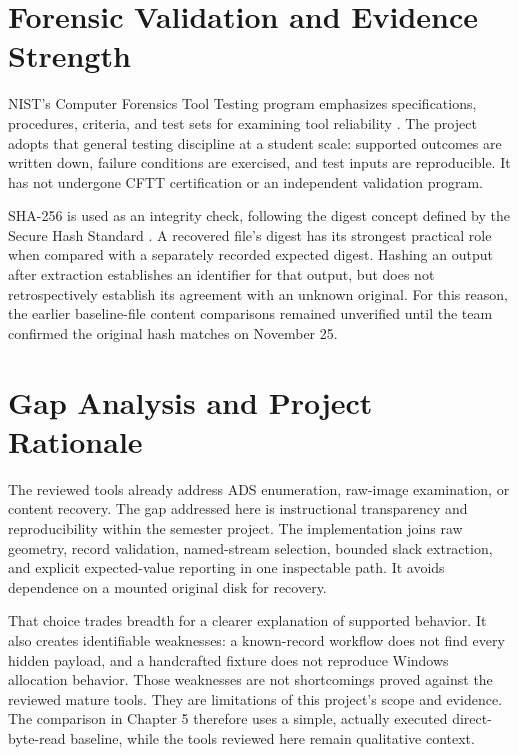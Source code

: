 \section{Forensic Validation and Evidence Strength}
NIST's Computer Forensics Tool Testing program emphasizes specifications,
procedures, criteria, and test sets for examining tool reliability
\cite{cftt}. The project adopts that general testing discipline at a student
scale: supported outcomes are written down, failure conditions are exercised,
and test inputs are reproducible. It has not undergone CFTT certification
or an independent validation program.

SHA-256 is used as an integrity check, following the digest concept defined
by the Secure Hash Standard \cite{sha}. A recovered file's digest has its
strongest practical role when compared with a separately recorded expected
digest. Hashing an output after extraction establishes an identifier for that
output, but does not retrospectively establish its agreement with an unknown
original. For this reason, the earlier baseline-file content comparisons remained
unverified until the team confirmed the original hash matches on November 25.

\section{Gap Analysis and Project Rationale}
The reviewed tools already address ADS enumeration, raw-image examination,
or content recovery. The gap addressed here is instructional transparency
and reproducibility within the semester project. The implementation joins
raw geometry, record validation, named-stream selection, bounded slack
extraction, and explicit expected-value reporting in one inspectable path.
It avoids dependence on a mounted original disk for recovery.

That choice trades breadth for a clearer explanation of supported behavior.
It also creates identifiable weaknesses: a known-record workflow does not
find every hidden payload, and a handcrafted fixture does not reproduce
Windows allocation behavior. Those weaknesses are not shortcomings proved
against the reviewed mature tools. They are limitations of this project's
scope and evidence. The comparison in Chapter 5 therefore uses a simple,
actually executed direct-byte-read baseline, while the tools reviewed here
remain qualitative context.
